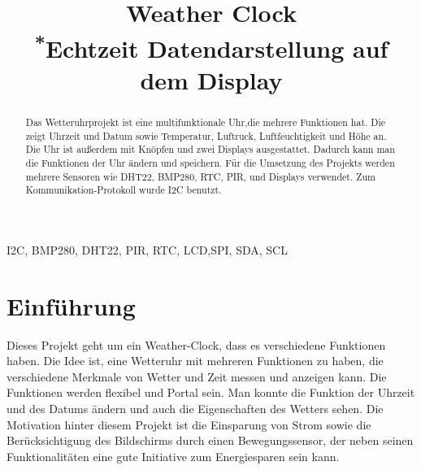 \documentclass[conference]{IEEEtran}
\begin{document}
\title{Weather Clock\\
{\footnotesize \textsuperscript{*}Echtzeit Datendarstellung auf dem Display}
}

\author{
\and
{}
}

\maketitle

\begin{abstract}
Das Wetteruhrprojekt ist eine multifunktionale Uhr,die  mehrere Funktionen hat. Die zeigt Uhrzeit und Datum sowie Temperatur, Luftruck, Luftfeuchtigkeit und Höhe an. Die Uhr ist außerdem mit Knöpfen und zwei Displays ausgestattet. Dadurch kann man die Funktionen der Uhr ändern und speichern. Für die Umsetzung des Projekts werden mehrere Sensoren wie DHT22, BMP280, RTC, PIR, und Displays verwendet. Zum Kommunikation-Protokoll wurde I2C benutzt.
\end{abstract}

\begin{IEEEkeywords}
I2C, BMP280, DHT22, PIR, RTC, LCD,SPI, SDA, SCL
\end{IEEEkeywords}

\section{Einführung}
Dieses Projekt geht um ein Weather-Clock, dass es verschiedene Funktionen haben. Die Idee ist, eine Wetteruhr mit mehreren Funktionen zu haben, die verschiedene Merkmale von Wetter und Zeit messen und anzeigen kann. Die Funktionen werden flexibel und Portal sein. Man konnte die Funktion der Uhrzeit und des Datums ändern und auch die Eigenschaften des Wetters sehen. Die Motivation hinter diesem Projekt ist die Einsparung von Strom sowie die Berücksichtigung des Bildschirms durch einen Bewegungssensor, der neben seinen Funktionalitäten eine gute Initiative zum Energiesparen sein kann.
\end{document}
